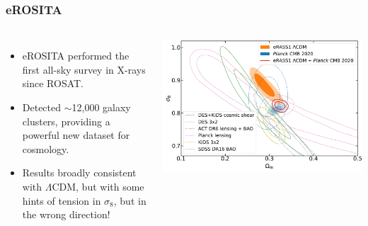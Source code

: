 \documentclass[aspectratio=169]{beamer}
\begin{document}
\begin{frame}
    \frametitle{eROSITA}
    \begin{columns}
        \begin{itemize}
            \item eROSITA performed the first all-sky survey in X-rays since ROSAT.
            \item Detected $\sim$12,000 galaxy clusters, providing a powerful new dataset for cosmology.
            \item Results broadly consistent with $\Lambda$CDM, but with some hints of tension in $\sigma_8$, but in the wrong direction! \hfill {}
        \end{itemize}
        \includegraphics[width=\textwidth]{figures/eROSITA.pdf}
    \end{columns}
\end{frame}
\end{document}
